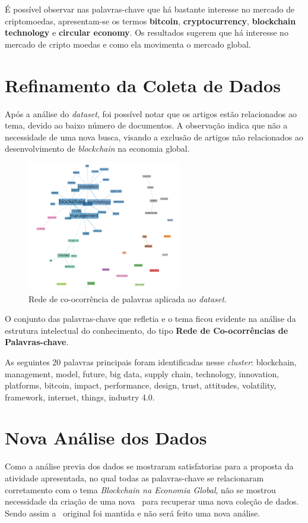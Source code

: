 É possível observar nas palavras-chave que há bastante interesse no mercado de criptomoedas, apresentam-se os termos \textbf{bitcoin}, \textbf{cryptocurrency}, \textbf{blockchain technology} e \textbf{circular economy}. Os resultados sugerem que há interesse no mercado de cripto moedas e como ela movimenta o mercado global.

\section{Refinamento da Coleta de Dados}

Após a análise do \textit{dataset}, foi possível notar que os artigos estão relacionados ao tema, devido ao baixo número de documentos. A observação indica que não a necessidade de uma nova busca, visando a exclusão de artigos não relacionados ao desenvolvimento de \textit{blockchain} na economia global.

\begin{figure}[htp]
    \centering
    \includegraphics[width=0.6\textwidth]{experiments/FernandoCordeiro/AnaliseBibliometrica/Blockchain/co-ocurrence.png}
    \caption{Rede de co-ocorrência de palavras aplicada ao \textit{dataset}.}
    \label{fig:BLOCKCHAIN@FernandoCordeiro:redecoocorrencia}
\end{figure}

O conjunto das palavras-chave que refletia e o tema ficou evidente na análise da estrutura intelectual do conhecimento, do tipo \textbf{Rede de Co-ocorrências de Palavras-chave}.

As seguintes 20 palavras principais foram identificadas nesse \textit{cluster}:
blockchain,
management,
model,
future,
big data,
supply chain,
technology,
innovation,
platforms,
bitcoin,
impact,
performance,
design,
trust,
attitudes,
volatility,
framework,
internet,
things,
industry 4.0.

\section{Nova Análise dos Dados}
    Como a análise previa dos dados se mostraram satisfatorias para a proposta da atividade apresentada, no qual todas as palavras-chave se relacionaram corretamento com o tema \textit{Blockchain na Economia Global}, não se mostrou necessidade da criação de uma nova \query\ para recuperar uma nova coleção de dados. Sendo assim a \query\ original foi mantida e não será feito uma nova análise. 

